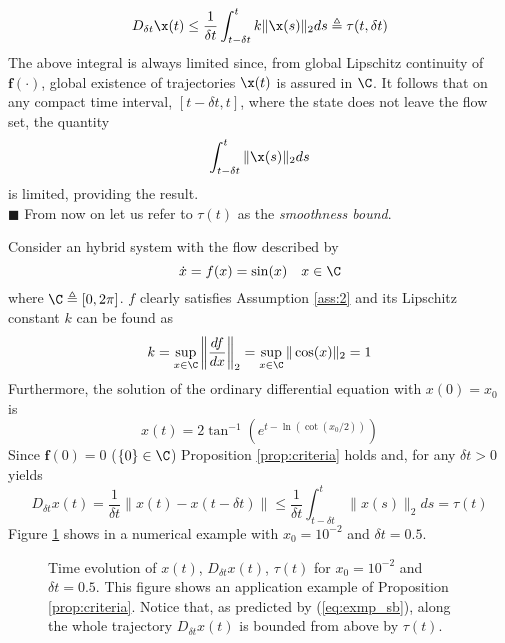     \begin{equation}
        D_{\delta t}\x(t)\leq\frac{1}{\delta t}\int_{t-\delta t}^{t}k\|\x(s)\|_2ds\triangleq\tau(t,\delta t)
    \end{equation}
    The above integral is always limited since, from global Lipschitz continuity of $\mathbf{\mathbf{f}}(\cdot)$, global existence of trajectories $\x(t)$ is assured in $\C$. It follows that on any compact time interval, $[t-\delta t,t]$, where the state does not leave the flow set, the quantity
    \begin{equation}
        \int_{t- \delta t}^{t}\|\x(s)\|_2ds
    \end{equation}
    is limited, providing the result.\\
    $\blacksquare$
\endproof
%
From now on let us refer to $\tau(t)$ as the \textit{smoothness bound}.
%
\begin{exmp}
	Consider an hybrid system with the flow described by 
	\begin{equation}
	    \dot{x}={{f}}(x)=\sin(x)\quad x\in\C
	\end{equation}
	where $\C\triangleq[0,2\pi]$. $f$ clearly satisfies Assumption \ref{ass:2} and its Lipschitz constant $k$ can be found as
	\begin{equation}
	    k=\sup\limits_{x\in\C}\left\|\frac{d {f}}{dx}\right\|_2=\sup\limits_{x\in\C}\|\cos(x)\|_2=1
	\end{equation}
	Furthermore, the solution of the ordinary differential equation with $x(0)=x_0$ is\
	\begin{equation}
	    x(t)= 2\tan^{-1}\left(e^{t-\ln(\cot(x_0/2))}\right)
	\end{equation}
	Since ${\mathbf{f}}(0)=0$ ($\{0\}\in\C$) Proposition \ref{prop:criteria} holds and, for any $\delta t>0$ yields
	\begin{equation}\label{eq:exmp_sb}
	    D_{\delta t}x(t)=\frac{1}{\delta t}\|x(t)-x(t-\delta t)\|\leq\frac{1}{\delta t}\int_{t-\delta t}^{t}\|x(s)\|_2ds=\tau(t)
	\end{equation}
	Figure \ref{fig:ex1} shows in a numerical example with $x_0=10^{-2}$ and $\delta t = 0.5$. 
	\begin{figure}[!t]
        \centering
        
        \caption{Time evolution of $x(t)$, $D_{\delta t}x(t)$, $\tau(t)$ for $x_0=10^{-2}$ and $\delta t=0.5$. This figure shows an application example of Proposition \ref{prop:criteria}. Notice that, as predicted by (\ref{eq:exmp_sb}), along the whole trajectory $D_{\delta t}x(t)$ is bounded from above by $\tau(t)$.}
        \label{fig:ex1}
    \end{figure}
\end{exmp}
